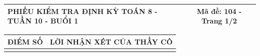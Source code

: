 \documentclass[12pt,a4paper]{article}
\begin{document}
\newpage
\noindent
\begin{tabularx}{\linewidth}{|X|c|}
\hline
\textbf{PHIẾU KIỂM TRA ĐỊNH KỲ TOÁN 8 - TUẦN 10 - BUỔI 1} & \textbf{Mã đề: 104 - Trang 1/2} \\
\hline
\end{tabularx}

\vspace{1.2mm}

\noindent
\begin{tabularx}{\linewidth}{|p{3.2cm}|X|}
\hline
\centering\textbf{ĐIỂM SỐ} & \centering\textbf{LỜI NHẬN XÉT CỦA THẦY CÔ} \tabularnewline
\hline
\rule{0pt}{1.8cm} & \tabularnewline
\hline
\end{tabularx}
\end{document}
